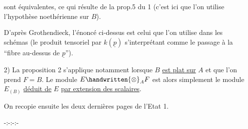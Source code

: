 sont équivalentes, ce qui résulte de la prop.5 du \handwritten{\S} 1 (c'est ici que l'on utilise l'hypothèse noethérienne sur $B$).

\handwritten{[}D'après Grothendieck, l'énoncé ci-dessus est celui que l'on utilise dans les schémas (le produit tensoriel par $k(\underline p)$ s'interprétant comme le passage à la ``fibre au-dessus de $\underline p$'').\handwritten{]}

2) La proposition 2 s'applique notamment lorsque $B$ \uline{est plat sur} $A$ et que l'on prend $F=B$. Le module $E\handwritten{\otimes}_A F$ est alors simplement le module $E_{(B)}$ \uline{déduit de} $E$ \uline{par extension des scalaires}.

On recopie ensuite les deux dernières pages de l'Etat 1.

\begin{center}-:-:-:-\end{center}

